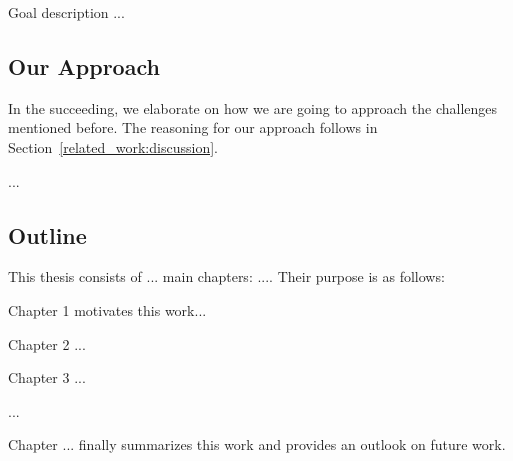 Goal description ...





\subsection{Our Approach}
In the succeeding, we elaborate on how we are going to approach the challenges mentioned before. The reasoning for our approach follows in Section~\ref{related_work:discussion}.

...


\subsection{Outline}

This thesis consists of ... main chapters: .... Their purpose is as follows:

Chapter 1 motivates this work...

Chapter 2 ...

Chapter 3 ...

...

Chapter ... finally summarizes this work and provides an outlook on future work.





